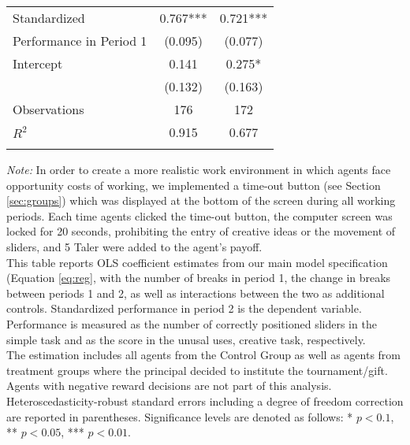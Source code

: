 \begin{table}[H]
\begin{center}
{\begin{tabular}{lcc}
Standardized&       0.767***&       0.721***\\
Performance in Period 1          &     (0.095)   &     (0.077)   \\[2mm]
Intercept   &       0.141  &       0.275* \\
            &     (0.132)   &     (0.163)   \\[2mm]
\hline\noalign{\smallskip}
Observations&         176   &         172   \\
$R^2$       &       0.915   &       0.677   \\
\hline\hline\noalign{\medskip}
\end{tabular}}
\begin{minipage}{0.70\textwidth}
\footnotesize
{\it Note:} In order to create a more realistic work environment  in which agents face opportunity costs of working, we implemented a time-out button (see Section \ref{sec:groups}) which was displayed at the bottom of the screen during all working periods. Each time agents clicked the time-out button, the computer screen was locked for 20 seconds, prohibiting the entry of creative ideas or the movement of sliders, and 5 Taler were added to the agent's payoff.\\ 
This table reports OLS coefficient estimates from our main model specification (Equation \ref{eq:reg},  with the number of breaks in period 1, the change in breaks between periods 1 and 2, as well as interactions between the two as additional controls. Standardized performance in period 2 is the dependent variable. Performance is measured as the number of correctly positioned sliders in the simple task and as the score in the unusal uses, creative task, respectively.\\
The estimation includes all agents from the Control Group as well as agents from treatment groups where the principal decided to institute the tournament/gift. Agents with negative reward decisions are not part of this analysis. Heteroscedasticity-robust standard errors including a degree of freedom correction are reported in parentheses. Significance levels are denoted as follows: * $p < 0.1$, ** $p < 0.05$, *** $p < 0.01$. \end{minipage}
\end{center}
\label{tab:EQ_Breaks_Results}
\end{table}


